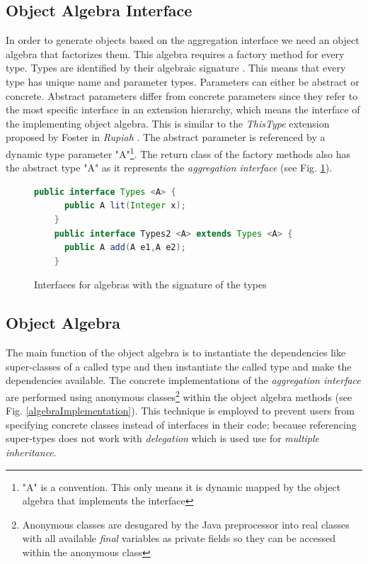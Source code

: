 \documentclass{report}
\begin{document}
\subsection{Object Algebra Interface}

\label{abstractParameter}

In order to generate objects based on the aggregation interface we need an object algebra that factorizes them. This algebra requires a factory method for every type. Types are identified by their algebraic signature \cite{Oliv-Extensibility-2012}. This means that every type has unique name and parameter types. Parameters can either be abstract or concrete. Abstract parameters differ from concrete parameters since they refer to the most specific interface in an extension hierarchy, which means the interface of the implementing object algebra. This is similar to the \emph{ThisType} extension proposed by Foster in \emph{Rupiah} \cite{Foster-Rupiah-2001}. The abstract parameter is referenced by a dynamic type parameter "A"\footnote{"A" is a convention. This only means it is dynamic mapped by the object algebra that implements the interface}. The return class of the factory methods also has the abstract type "A" as it represents the \emph{aggregation interface} (see Fig. \ref{algebraInterfaces}).

\begin{figure}[h]
\begin{lstlisting}[language=java]
    public interface Types <A> {
      public A lit(Integer x);
    }
    public interface Types2 <A> extends Types <A> {
      public A add(A e1,A e2);
    }
\end{lstlisting}
\caption{Interfaces for algebras with the signature of the types}
\label{algebraInterfaces}
\end{figure}

\subsection{Object Algebra}

The main function of the object algebra is to instantiate the dependencies like super-classes of a called type and then instantiate the called type and make the dependencies available. The concrete implementations of the \emph{aggregation interface} are performed using anonymous classes\footnote{Anonymous classes are desugared by the Java preprocessor into real classes with all available \emph{final} variables as private fields so they can be accessed within the anonymous class} within the object algebra methods (see Fig. \ref{algebraImplementation}). This technique is employed to prevent users from specifying concrete classes instead of interfaces in their code; because referencing super-types does not work with \emph{delegation} which is used use for \emph{multiple inheritance}.
\end{document}
